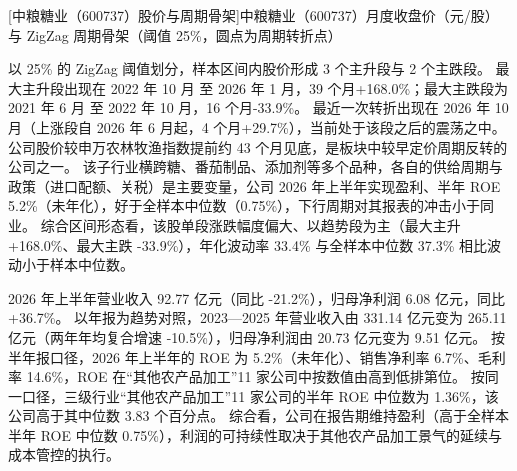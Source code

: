 \begin{center}
\begin{minipage}{\textwidth}\centering
{}

[中粮糖业（600737）股价与周期骨架]{中粮糖业（600737）月度收盘价（元/股）与 ZigZag 周期骨架（阈值 25\%，圆点为周期转折点）}
\end{minipage}
\end{center}

 以 25\% 的 ZigZag 阈值划分，样本区间内股价形成 3 个主升段与 2 个主跌段。 最大主升段出现在 2022 年 10 月 至 2026 年 1 月，39 个月+168.0\%；最大主跌段为 2021 年 6 月 至 2022 年 10 月，16 个月-33.9\%。 最近一次转折出现在 2026 年 10 月（上涨段自 2026 年 6 月起，4 个月+29.7\%），当前处于该段之后的震荡之中。 公司股价较申万农林牧渔指数提前约 43 个月见底，是板块中较早定价周期反转的公司之一。 该子行业横跨糖、番茄制品、添加剂等多个品种，各自的供给周期与政策（进口配额、关税）是主要变量，公司 2026 年上半年实现盈利、半年 ROE 5.2\%（未年化），好于全样本中位数（0.75\%），下行周期对其报表的冲击小于同业。 综合区间形态看，该股单段涨跌幅度偏大、以趋势段为主（最大主升 +168.0\%、最大主跌 -33.9\%），年化波动率 33.4\% 与全样本中位数 37.3\% 相比波动小于样本中位数。

 2026 年上半年营业收入 92.77 亿元（同比 -21.2\%），归母净利润 6.08 亿元，同比 +36.7\%。 以年报为趋势对照，2023---2025 年营业收入由 331.14 亿元变为 265.11 亿元（两年年均复合增速 -10.5\%），归母净利润由 20.73 亿元变为 9.51 亿元。 按半年报口径，2026 年上半年的 ROE 为 5.2\%（未年化）、销售净利率 6.7\%、毛利率 14.6\%，ROE 在“其他农产品加工”11 家公司中按数值由高到低排第位。 按同一口径，三级行业“其他农产品加工”11 家公司的半年 ROE 中位数为 1.36\%，该公司高于其中位数 3.83 个百分点。 综合看，公司在报告期维持盈利（高于全样本半年 ROE 中位数 0.75\%），利润的可持续性取决于其他农产品加工景气的延续与成本管控的执行。

